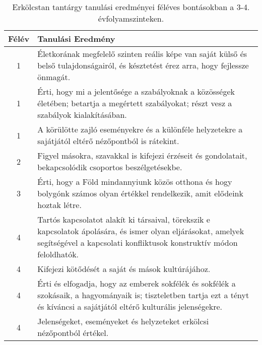 \begin{longtable}{c | p{} }
                        \end{longtable}
            \clearpage

       
           \begin{longtable}{c | p{} }
            \caption[Erkölcstan 3-4.]{Erkölcstan tantárgy tanulási eredményei féléves bontásokban a 3-4. évfolyamszinteken. }  \\

            \textbf{Félév} & \textbf{Tanulási Eredmény} \\
            \hline
            \endhead
                                
                                          1 &  Életkorának megfelelő szinten reális képe van saját külső és belső tulajdonságairól, és késztetést érez arra, hogy fejlessze önmagát. \\ \hline
                                          1 &  Érti, hogy mi a jelentősége a szabályoknak a közösségek életében; betartja a megértett szabályokat; részt vesz a szabályok kialakításában. \\ \hline
                                          1 &  A körülötte zajló eseményekre és a különféle helyzetekre a sajátjától eltérő nézőpontból is rátekint. \\ \hline
                                      
                                
                                          2 &  Figyel másokra, szavakkal is kifejezi érzéseit és gondolatait, bekapcsolódik csoportos beszélgetésekbe. \\ \hline
                                      
                                
                                          3 &  Érti, hogy a Föld mindannyiunk közös otthona és hogy bolygónk számos olyan értékkel rendelkezik, amit elődeink hoztak létre. \\ \hline
                                      
                                
                                          4 &  Tartós kapcsolatot alakít ki társaival, törekszik e kapcsolatok ápolására, és ismer olyan eljárásokat, amelyek segítségével a kapcsolati konfliktusok konstruktív módon feloldhatók. \\ \hline
                                          4 &  Kifejezi kötődését a saját és mások kultúrájához. \\ \hline
                                          4 &  Érti és elfogadja, hogy az emberek sokfélék és sokfélék a szokásaik, a hagyományaik is; tiszteletben tartja ezt a tényt és kíváncsi a sajátjától eltérő kulturális jelenségekre. \\ \hline
                                          4 &  Jelenségeket, eseményeket és helyzeteket erkölcsi nézőpontból értékel. \\ \hline
                                      
                        \end{longtable}
            \clearpage

